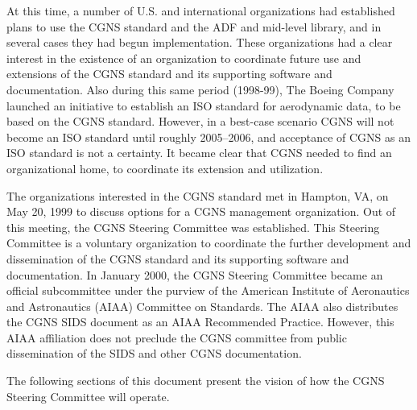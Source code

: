 At this time, a number of U.S. and international organizations had
established plans to use the CGNS standard and the ADF and
mid-level library, and in several cases they had begun implementation.
These organizations had a clear interest in the existence of an
organization to coordinate future use and extensions of the CGNS
standard and its supporting software and documentation.
Also during this same period (1998-99), The Boeing Company launched an
initiative to establish an ISO
standard for aerodynamic data, to be based on the CGNS standard.
However, in a best-case scenario CGNS will not become an ISO standard
until roughly 2005--2006, and acceptance of CGNS as an ISO standard is
not a certainty.
It became clear that CGNS needed to find an organizational home, to
coordinate its extension and utilization.

The organizations interested in the CGNS standard met in Hampton, VA,
on May 20, 1999 to discuss options for a CGNS management organization.
Out of this meeting, the CGNS Steering Committee was established.
This Steering Committee is a voluntary organization to coordinate the
further development and dissemination of the CGNS standard and its
supporting software and documentation.
In January 2000, the CGNS Steering Committee became an official
subcommittee under the purview of the American Institute of Aeronautics
and Astronautics (AIAA) Committee on Standards.
The AIAA also distributes the CGNS SIDS document as an AIAA Recommended
Practice.
However, this AIAA affiliation does not preclude the CGNS committee from
public dissemination of the SIDS and other CGNS documentation.

The following sections of this document present the vision of how the
CGNS Steering Committee will operate.
